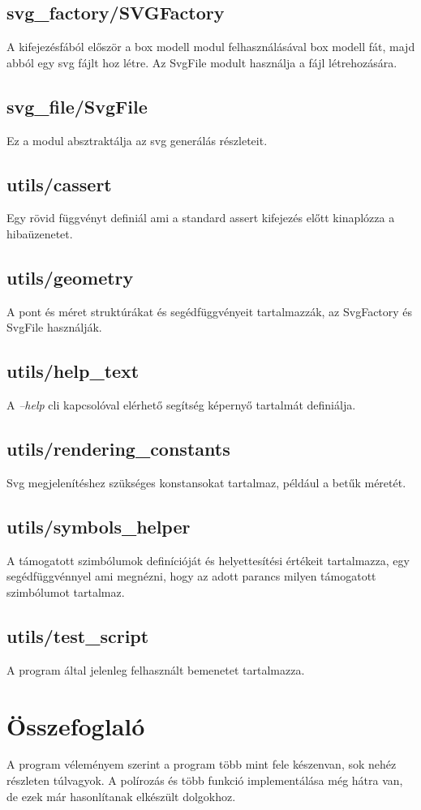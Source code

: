 \documentclass{article}[12pt,a4paper]
\newcommand{\lang}[1]{\textit{#1}}
\begin{document}
    \subsection{svg\_factory/SVGFactory}
    A kifejezésfából először a box modell modul felhasználásával box modell fát, majd abból egy svg fájlt hoz létre.
    Az SvgFile modult használja a fájl létrehozására.

    \subsection{svg\_file/SvgFile}
    Ez a modul absztraktálja az svg generálás részleteit.

    \subsection{utils/cassert}
    Egy rövid függvényt definiál ami a standard assert kifejezés előtt kinaplózza a hibaüzenetet.

    \subsection{utils/geometry}
    A pont és méret struktúrákat és segédfüggvényeit tartalmazzák, az SvgFactory és SvgFile használják.

    \subsection{utils/help\_text}
    A \lang{--help} cli kapcsolóval elérhető segítség képernyő tartalmát definiálja.

    \subsection{utils/rendering\_constants}
    Svg megjelenítéshez szükséges konstansokat tartalmaz, például a betűk méretét.

    \subsection{utils/symbols\_helper}
    A támogatott szimbólumok definícióját és helyettesítési értékeit tartalmazza, egy segédfüggvénnyel ami megnézni, hogy az adott parancs milyen támogatott szimbólumot tartalmaz.

    \subsection{utils/test\_script}
    A program által jelenleg felhasznált bemenetet tartalmazza.

    \section{Összefoglaló}
    A program véleményem szerint a program több mint fele készenvan, sok nehéz részleten túlvagyok.
    A polírozás és több funkció implementálása még hátra van, de ezek már hasonlítanak elkészült dolgokhoz.
\end{document}
